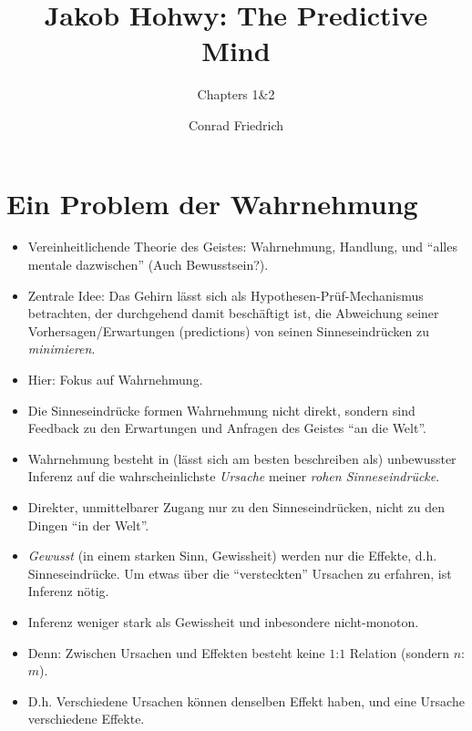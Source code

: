 \documentclass[12pt, handout]{beamer}
\title[The Predictive Mind]{Jakob Hohwy: The Predictive Mind}
\subtitle{Chapters 1\&2}
\author{Conrad Friedrich}
\institute[Uni Köln]{Universität zu Köln}
\begin{document}
\begin{frame}[plain]
  \maketitle
\end{frame}

\section{Ein Problem der Wahrnehmung}

\begin{frame}
  \begin{itemize}[<+->]
  \item Vereinheitlichende Theorie des Geistes: Wahrnehmung, Handlung,
    und ``alles mentale dazwischen'' (Auch Bewusstsein?).
  \item Zentrale Idee: Das Gehirn lässt sich als
    Hypothesen-Prüf-Mechanismus betrachten, der durchgehend damit
    beschäftigt ist, die Abweichung seiner Vorhersagen/Erwartungen
    (predictions) von seinen Sinneseindrücken zu \emph{minimieren}.
  \item Hier: Fokus auf Wahrnehmung.
  \item Die Sinneseindrücke formen Wahrnehmung nicht direkt, sondern
    sind Feedback zu den Erwartungen und Anfragen des Geistes ``an die
    Welt''.
  \end{itemize}
\end{frame}

\begin{frame}
  \begin{itemize}[<+->]
  \item Wahrnehmung besteht in (lässt sich am besten beschreiben als)
    unbewusster Inferenz auf die wahrscheinlichste \emph{Ursache}
    meiner \emph{rohen Sinneseindrücke}.
  \item Direkter, unmittelbarer Zugang nur zu den Sinneseindrücken,
    nicht zu den Dingen ``in der Welt''.
  \item \emph{Gewusst} (in einem starken Sinn, Gewissheit) werden nur
    die Effekte, d.h. Sinneseindrücke. Um etwas über die
    ``versteckten'' Ursachen zu erfahren, ist Inferenz nötig.
  \item Inferenz weniger stark als Gewissheit und inbesondere
    nicht-monoton.
  \item Denn: Zwischen Ursachen und Effekten besteht keine $1$:$1$
    Relation (sondern $n$:$m$).
  \item D.h. Verschiedene Ursachen können denselben Effekt haben, und
    eine Ursache verschiedene Effekte.
  \end{itemize}
\end{frame}
\end{document}
